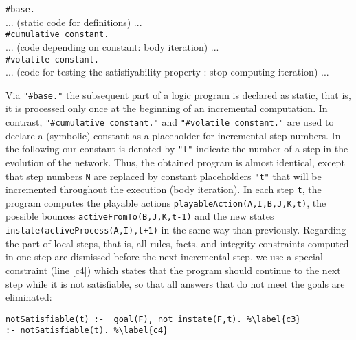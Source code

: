 \begin{tabbing}
\texttt{\#base.}  \\
... (static code for definitions) ... \\
\texttt{\#cumulative constant.}  \\
... (code depending on constant: body iteration) ... \\
\texttt{\#volatile constant.} \\
... (code for testing the satisfiyability property : stop computing iteration) ...
\end{tabbing}

Via \texttt{"\#base."} the subsequent part of a logic program is declared as static, that is, it is processed only once at the beginning of an incremental computation. In contrast, \texttt{"\#cumulative constant."} and \texttt{"\#volatile constant."}  are used to declare a (symbolic) constant as a placeholder for incremental step numbers.
In the following our constant is denoted by \texttt{"t"} indicate the number of a step in the evolution of the network.
Thus, the obtained program is almost identical,
except that step numbers \texttt{N}
are replaced by constant placeholders \texttt{"t"}
that will be incremented throughout the execution (body iteration).
In each step \texttt{t}, the program computes the playable actions \texttt{playableAction(A,I,B,J,K,t)}, the possible bounces \texttt{activeFromTo(B,J,K,t-1)}
and the new states \texttt{instate(activeProcess(A,I),t+1)}
in the same way than previously.
Regarding the part of local steps, that is, all rules, facts, and integrity constraints computed in one step are dismissed before the next incremental step,
we use a special constraint (line \ref{c4})
which states that the program should continue to the next step
while it is not satisfiable,
so that all answers that do not meet the goals are eliminated:
\begin{lstlisting}
notSatisfiable(t) :-  goal(F), not instate(F,t). %\label{c3}
:- notSatisfiable(t). %\label{c4}
\end{lstlisting}
